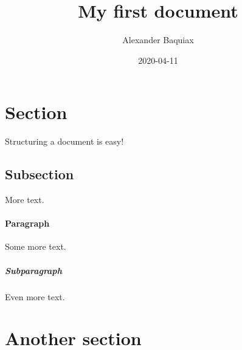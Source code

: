 \documentclass{article}
\title{My first document}
\date{2020-04-11}
\author{Alexander Baquiax}
\begin{document}
\maketitle
\newpage
{}

\section{Section}
Structuring a document is easy!

\subsection{Subsection}
More text.

\paragraph{Paragraph}
Some more text.

\subparagraph{Subparagraph}
Even more text.

\section{Another section}
\end{document}

